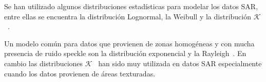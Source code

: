 
Se han utilizado algunos distribuciones estadísticas para modelar los datos SAR, entre ellas se encuentra la distribución Lognormal, la Weibull y la distribución $\mathcal{K}$~\cite{Lee2009}. 

Un modelo común para datos que provienen de zonas homogéneas y con mucha presencia de ruido speckle son la distribución exponencial y la Rayleigh~\cite{Frery97}. En cambio las distribuciones $\mathcal{K}$~\cite{Jakeman87} han sido muy utilizada en datos SAR especialmente cuando los datos provienen de áreas texturadas. 

